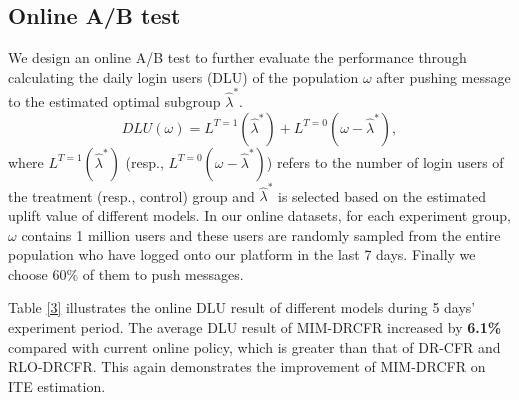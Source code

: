 \documentclass[sigconf]{acmart}
\begin{document}
\subsection{Online A/B test}
We design an online A/B test to further evaluate the performance through calculating the daily login users (DLU) of the population $\omega$ after pushing message to the estimated optimal subgroup $\hat{\lambda}^{*}$.
\begin{equation}
    DLU(\omega) = L^{T=1}(\hat{\lambda}^{*}) + L^{T=0}(\omega - \hat{\lambda}^{*}),
\end{equation}
where $L^{T=1}(\hat{\lambda}^{*})$ (resp., $L^{T=0}(\omega - \hat{\lambda}^{*})$) refers to the number of login users of the treatment (resp., control) group and $\hat{\lambda}^{*}$ is selected based on the estimated uplift value of different models. In our online datasets, for each experiment group, $\omega$ contains 1 million users and these users are randomly sampled from the entire population who have logged onto our platform in the last 7 days. Finally we choose $60\%$ of them to push messages. \par
Table \ref{3} illustrates the online DLU result of different models during 5 days' experiment period. The average DLU result of MIM-DRCFR increased by \textbf{6.1\%} compared with current online policy, which is greater than that of DR-CFR and RLO-DRCFR. This again demonstrates the improvement of MIM-DRCFR on ITE estimation.
\end{document}
